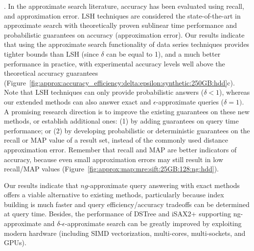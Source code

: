 {. 
In the approximate search literature, accuracy has been evaluated using recall, and approximation error. 
LSH techniques are considered the state-of-the-art in approximate search with theoretically proven sublinear time performance and probabilistic guarantees on accuracy (approximation error). 
Our results indicate that using the approximate search functionality of data series techniques provides tighter bounds than LSH (since $\delta$ can be equal to 1), and a much better performance in practice, with experimental accuracy levels well above the theoretical accuracy guarantees (Figure~\ref{fig:approx:accuracy_efficiency:delta:epsilon:synthetic:250GB:hdd}c). Note that LSH techniques can only provide probabilistic answers ($\delta < 1$), whereas our extended methods can also answer exact and $\epsilon$-approximate queries ($\delta = 1)$. 
A promising research direction is to improve the existing guarantees on these new methods, or establish additional ones: (1) by adding guarantees on query time performance; or (2) by developing probabilistic or deterministic guarantees on the recall or MAP value of a result set, instead of the commonly used distance approximation error. 
Remember that recall and MAP are better indicators of accuracy, because even small approximation errors may still result in low recall/MAP values (Figure~\ref{fig:approx:map:mre:sift:25GB:128:ng:hdd}). 

Our results indicate that $ng$-approximate query answering with exact methods offers a viable alternative to existing methods, particularly because index building is much faster and query efficiency/accuracy tradeoffs can be determined at query time.
Besides, the performance of DSTree and iSAX2+ supporting {\color{black}ng-approximate and} $\delta$-$\epsilon$-approximate search can be greatly improved by exploiting modern hardware (including SIMD vectorization, multi-cores, multi-sockets, and GPUs).

}
